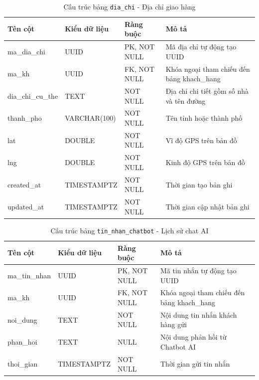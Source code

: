 \begin{table}[H]
  \centering
  \begin{tabularx}{\textwidth}{|l|l|l|>{\raggedright\arraybackslash}X|}
    \hline
    \textbf{Tên cột} & \textbf{Kiểu dữ liệu} & \textbf{Ràng buộc} & \textbf{Mô tả} \\
    \hline
    ma\_dia\_chi         & UUID            & PK, NOT NULL    & Mã địa chỉ tự động tạo UUID \\ \hline
    ma\_kh               & UUID            & FK, NOT NULL    & Khóa ngoại tham chiếu đến bảng khach\_hang \\ \hline
    dia\_chi\_cu\_the    & TEXT            & NOT NULL        & Địa chỉ chi tiết gồm số nhà và tên đường \\ \hline
    thanh\_pho           & VARCHAR(100)    & NOT NULL        & Tên tỉnh hoặc thành phố \\ \hline
    lat                  & DOUBLE          & NOT NULL        & Vĩ độ GPS trên bản đồ \\ \hline
    lng                  & DOUBLE          & NOT NULL        & Kinh độ GPS trên bản đồ \\ \hline
    created\_at          & TIMESTAMPTZ     & NOT NULL        & Thời gian tạo bản ghi \\ \hline
    updated\_at          & TIMESTAMPTZ     & NOT NULL        & Thời gian cập nhật bản ghi \\
    \hline
  \end{tabularx}
  \caption{Cấu trúc bảng \texttt{dia\_chi} - Địa chỉ giao hàng}
  \label{tab:db-dia-chi}
\end{table}

\begin{table}[H]
  \centering
  \begin{tabularx}{\textwidth}{|l|l|l|>{\raggedright\arraybackslash}X|}
    \hline
    \textbf{Tên cột} & \textbf{Kiểu dữ liệu} & \textbf{Ràng buộc} & \textbf{Mô tả} \\
    \hline
    ma\_tin\_nhan        & UUID            & PK, NOT NULL    & Mã tin nhắn tự động tạo UUID \\ \hline
    ma\_kh               & UUID            & FK, NOT NULL    & Khóa ngoại tham chiếu đến bảng khach\_hang \\ \hline
    noi\_dung            & TEXT            & NOT NULL        & Nội dung tin nhắn khách hàng gửi \\ \hline
    phan\_hoi            & TEXT            & NULL            & Nội dung phản hồi từ Chatbot AI \\ \hline
    thoi\_gian           & TIMESTAMPTZ     & NOT NULL        & Thời gian gửi tin nhắn \\
    \hline
  \end{tabularx}
  \caption{Cấu trúc bảng \texttt{tin\_nhan\_chatbot} - Lịch sử chat AI}
  \label{tab:db-tin-nhan-chatbot}
\end{table}

